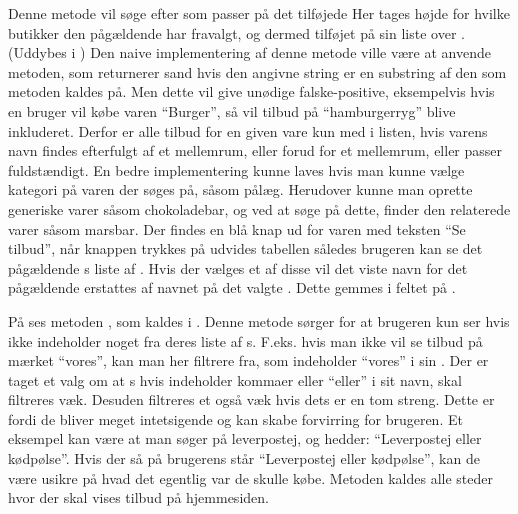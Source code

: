 Denne metode vil søge efter  som passer på det tilføjede 
Her tages højde for hvilke butikker den pågældende  har fravalgt, og dermed tilføjet på sin liste over .(Uddybes i  )
Den naive implementering af denne metode ville være at anvende  metoden, som returnerer sand hvis den angivne string er en substring af den som metoden kaldes på. 
Men dette vil give unødige falske-positive, eksempelvis hvis en bruger vil købe varen ``Burger'', så vil tilbud på ``hamburgerryg'' blive inkluderet.
Derfor er alle tilbud for en given vare kun med i listen, hvis varens navn findes efterfulgt af et mellemrum, eller forud for et mellemrum, eller passer fuldstændigt.
En bedre implementering kunne laves hvis man kunne vælge kategori på varen der søges på, såsom pålæg.
Herudover kunne man oprette generiske varer såsom chokoladebar, og ved at søge på dette, finder den relaterede varer såsom marsbar.
Der findes en blå knap ud for varen med teksten ``Se tilbud'', når knappen trykkes på udvides tabellen således brugeren kan se det pågældende s liste af .
Hvis der vælges et af disse  vil det viste navn for det pågældende  erstattes af navnet på det valgte .
Dette gemmes i feltet  på .

På  ses metoden , som kaldes i . Denne metode sørger for at brugeren kun ser  hvis  ikke indeholder noget fra deres liste af s.
F.eks. hvis man ikke vil se tilbud på mærket ``vores'', kan man her filtrere  fra, som indeholder ``vores'' i sin . 
Der er taget et valg om at s hvis  indeholder kommaer eller ``eller'' i sit navn, skal filtreres væk.
Desuden filtreres et  også væk hvis dets  er en tom streng.
Dette er fordi de bliver meget intetsigende og kan skabe forvirring for brugeren. 
Et eksempel kan være at man søger på leverpostej, og  hedder: ``Leverpostej eller kødpølse''. 
Hvis der så på brugerens   står ``Leverpostej eller kødpølse'', kan de være usikre på hvad det egentlig var de skulle købe. 
Metoden kaldes alle steder hvor der skal vises tilbud på hjemmesiden.

